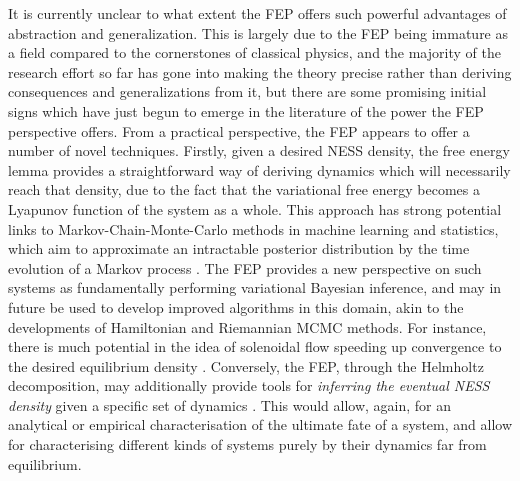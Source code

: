 It is currently unclear to what extent the FEP offers such powerful advantages of abstraction and generalization. This is largely due to the FEP being immature as a field compared to the cornerstones of classical physics, and the majority of the research effort so far has gone into making the theory precise rather than deriving consequences and generalizations from it, but there are some promising initial signs which have just begun to emerge in the literature of the power the FEP perspective offers. From a practical perspective, the FEP appears to offer a number of novel techniques. Firstly, given a desired NESS density, the free energy lemma provides a straightforward way of deriving dynamics which will necessarily reach that density, due to the fact that the variational free energy becomes a Lyapunov function of the system as a whole. This approach has strong potential links to Markov-Chain-Monte-Carlo methods in machine learning and statistics, which aim to approximate an intractable posterior distribution by the time evolution of a Markov process \citep{metropolis1953equation,neal2011mcmc,betancourt2017conceptual,chen2014stochastic,brooks2011handbook}. The FEP provides a new perspective on such systems as fundamentally performing variational Bayesian inference, and may in future be used to develop improved algorithms in this domain, akin to the developments of Hamiltonian \citep{betancourt2013generalizing} and Riemannian MCMC \citep{girolami2011riemann} methods. For instance, there is much potential in the idea of solenoidal flow speeding up convergence to the desired equilibrium density \citep{ma2015complete}. Conversely, the FEP, through the Helmholtz decomposition, may additionally provide tools for \emph{inferring the eventual NESS density} given a specific set of dynamics \citep{ma2015complete,friston2019particularphysics}. This would allow, again, for an analytical or empirical characterisation of the ultimate fate of a system, and allow for characterising different kinds of systems purely by their dynamics far from equilibrium. 

